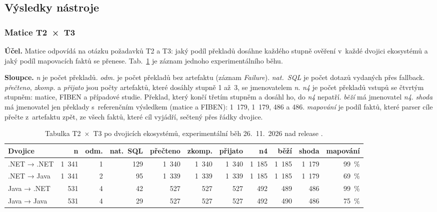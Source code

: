 \subsection{Výsledky nástroje}\label{sec:vysledky}

\subsubsection*{Matice T2~×~T3}

\textbf{Účel.} Matice odpovídá na otázku požadavků T2 a T3: jaký podíl překladů dosáhne každého stupně ověření v~každé dvojici ekosystémů a jaký podíl mapovacích faktů se přenese. Tab.~\ref{tab:t2t3} je záznam jednoho experimentálního běhu.

\textbf{Sloupce.} \emph{n} je počet překladů. \emph{odm.} je počet překladů bez artefaktu (záznam \emph{Failure}). \emph{nat.\ SQL} je počet dotazů vydaných přes fallback. \emph{přečteno}, \emph{zkomp.} a \emph{přijato} jsou počty artefaktů, které dosáhly stupně 1 až~3, se jmenovatelem \emph{n}. \emph{n4} je počet překladů vstupů se čtvrtým stupněm: matice, FIBEN a případové studie. Překlad, který končí třetím stupněm a dosáhl ho, do \emph{n4} nepatří. \emph{běží} má jmenovatel \emph{n4}. \emph{shoda} má jmenovatel jen překlady s~referenčním výsledkem (matice a FIBEN): 1~179, 1~179, 486 a 486. \emph{mapování} je podíl faktů, které parser cíle přečte z~artefaktu zpět, ze všech faktů, které cíl vyjádří, sečtený přes řádky dvojice.

\begin{table}[H]
\centering\footnotesize
\setlength{\tabcolsep}{4pt}
\begin{tabular}{l r r r r r r r r r r}
\toprule
\textbf{Dvojice} & \textbf{n} & \textbf{odm.} & \textbf{nat.\ SQL} & \textbf{přečteno} & \textbf{zkomp.} & \textbf{přijato} & \textbf{n4} & \textbf{běží} & \textbf{shoda} & \textbf{mapování} \\
\midrule
.NET → .NET & 1~341 & 1 & 129 & 1~340 & 1~340 & 1~340 & 1~185 & 1~185 & 1~179 & 99~\% \\
.NET → Java & 1~341 & 2 & 95 & 1~339 & 1~339 & 1~339 & 1~185 & 1~185 & 1~179 & 69~\% \\
Java → .NET & 531 & 4 & 42 & 527 & 527 & 527 & 492 & 489 & 486 & 99~\% \\
Java → Java & 531 & 4 & 29 & 527 & 527 & 527 & 492 & 490 & 486 & 75~\% \\
\bottomrule
\end{tabular}
\caption{Tabulka T2~×~T3 po dvojicích ekosystémů, experimentální běh 26.~11.~2026 nad release \texttt{\Vydani}.}
\label{tab:t2t3}
\end{table}

